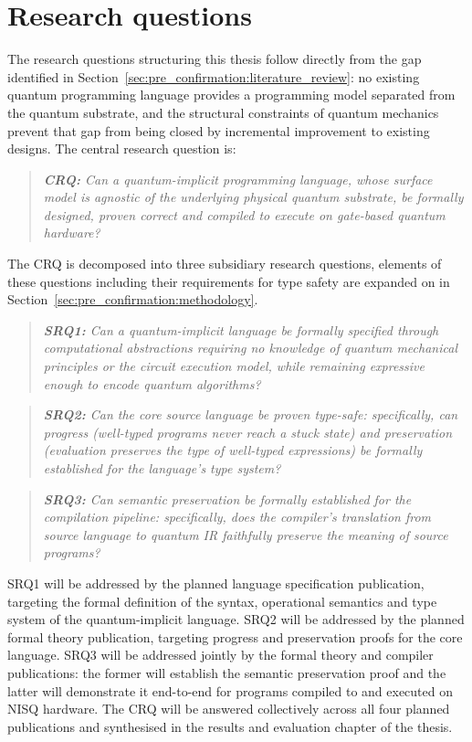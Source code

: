 \section{Research questions}\label{sec:pre_confirmation:research_questions}
The research questions structuring this thesis follow directly from the gap identified in Section~\ref{sec:pre_confirmation:literature_review}: no existing quantum programming language provides a programming model separated from the quantum substrate, and the structural constraints of quantum mechanics prevent that gap from being closed by incremental improvement to existing designs.
The central research question is:

\begin{quote}
    \textit{\textbf{CRQ: }Can a quantum-implicit programming language, whose surface model is agnostic of the underlying physical quantum substrate, be formally designed, proven correct and compiled to execute on gate-based quantum hardware?}
\end{quote}

The CRQ is decomposed into three subsidiary research questions, elements of these questions including their requirements for type safety are expanded on in Section~\ref{sec:pre_confirmation:methodology}.

\begin{quote}
    \textit{\textbf{SRQ1: }Can a quantum-implicit language be formally specified through computational abstractions requiring no knowledge of quantum mechanical principles or the circuit execution model, while remaining expressive enough to encode quantum algorithms?}
\end{quote}

\begin{quote}
    \textit{\textbf{SRQ2: }Can the core source language be proven type-safe: specifically, can \emph{progress} (well-typed programs never reach a stuck state) and \emph{preservation} (evaluation preserves the type of well-typed expressions) be formally established for the language's type system?}
\end{quote}

\begin{quote}
    \textit{\textbf{SRQ3: }Can semantic preservation be formally established for the compilation pipeline: specifically, does the compiler's translation from source language to quantum IR faithfully preserve the meaning of source programs?}
\end{quote}

SRQ1 will be addressed by the planned language specification publication, targeting the formal definition of the syntax, operational semantics and type system of the quantum-implicit language.
SRQ2 will be addressed by the planned formal theory publication, targeting progress and preservation proofs for the core language.
SRQ3 will be addressed jointly by the formal theory and compiler publications: the former will establish the semantic preservation proof and the latter will demonstrate it end-to-end for programs compiled to and executed on NISQ hardware.
The CRQ will be answered collectively across all four planned publications and synthesised in the results and evaluation chapter of the thesis.